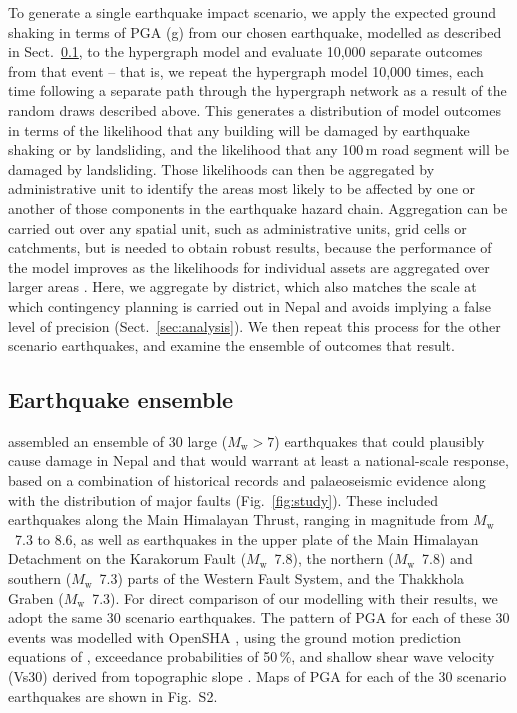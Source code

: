 \documentclass[nhess, manuscript]{copernicus}
\begin{document}
To generate a single earthquake impact scenario, we apply the expected ground shaking in terms of PGA (g) from our chosen earthquake, modelled as described in Sect.~\ref{sec:ensemble}, to the hypergraph model and evaluate 10,000 separate outcomes from that event -- that is, we repeat the hypergraph model 10,000 times, each time following a separate path through the hypergraph network as a result of the random draws described above. This generates a distribution of model outcomes in terms of the likelihood that any building will be damaged by earthquake shaking or by landsliding, and the likelihood that any 100\,\unit{m} road segment will be damaged by landsliding. Those likelihoods can then be aggregated by administrative unit to identify the areas most likely to be affected by one or another of those components in the earthquake hazard chain. Aggregation can be carried out over any spatial unit, such as administrative units, grid cells or catchments, but is needed to obtain robust results, because the performance of the model improves as the likelihoods for individual assets are aggregated over larger areas \citep{Dunant2025}. Here, we aggregate by district, which also matches the scale at which contingency planning is carried out in Nepal and avoids implying a false level of precision (Sect.~\ref{sec:analysis}). We then repeat this process for the other scenario earthquakes, and examine the ensemble of outcomes that result.

\subsection{Earthquake ensemble}
\label{sec:ensemble}

\citet{Robinson2018} assembled an ensemble of 30 large ($M_{\mathrm{w}} > 7$) earthquakes that could plausibly cause damage in Nepal and that would warrant at least a national-scale response, based on a combination of historical records and palaeoseismic evidence along with the distribution of major faults (Fig.~\ref{fig:study}). These included earthquakes along the Main Himalayan Thrust, ranging in magnitude from $M_{\mathrm{w}}$~7.3 to 8.6, as well as earthquakes in the upper plate of the Main Himalayan Detachment on the Karakorum Fault ($M_{\mathrm{w}}$~7.8), the northern ($M_{\mathrm{w}}$~7.8) and southern ($M_{\mathrm{w}}$~7.3) parts of the Western Fault System, and the Thakkhola Graben ($M_{\mathrm{w}}$~7.3). For direct comparison of our modelling with their results, we adopt the same 30 scenario earthquakes. The pattern of PGA for each of these 30 events was modelled with OpenSHA \citep{Field2003}, using the ground motion prediction equations of \citet{Abrahamson2008}, exceedance probabilities of 50\,\%, and shallow shear wave velocity (Vs30) derived from topographic slope \citep{Allen2009}. Maps of PGA for each of the 30 scenario earthquakes are shown in Fig.~S2.
\end{document}
